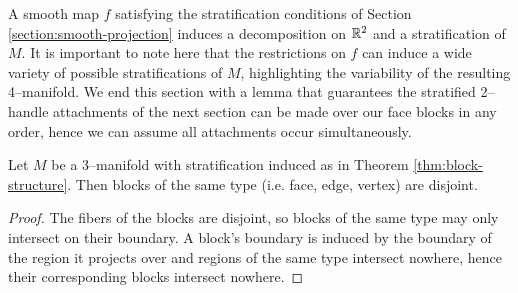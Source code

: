 A smooth map $f$ satisfying the stratification conditions of Section \ref{section:smooth-projection} induces a decomposition on $\mathbb{R}^2$ and a stratification of $M$.
It is important to note here that the restrictions on $f$ can induce a wide variety of possible stratifications of $M$, highlighting the variability of the resulting 4--manifold.
We end this section with a lemma that guarantees the stratified 2--handle attachments of the next section can be made over our face blocks in any order, hence we can assume all attachments occur simultaneously.


\begin{lem}
	Let $M$ be a 3--manifold with stratification induced as in Theorem \ref{thm:block-structure}.
	Then blocks of the same type (i.e. face, edge, vertex) are disjoint.
\end{lem}

\begin{proof}
	The fibers of the blocks are disjoint, so blocks of the same type may only intersect on their boundary.
	A block's boundary is induced by the boundary of the region it projects over and regions of the same type intersect nowhere, hence their corresponding blocks intersect nowhere.	
\end{proof}


